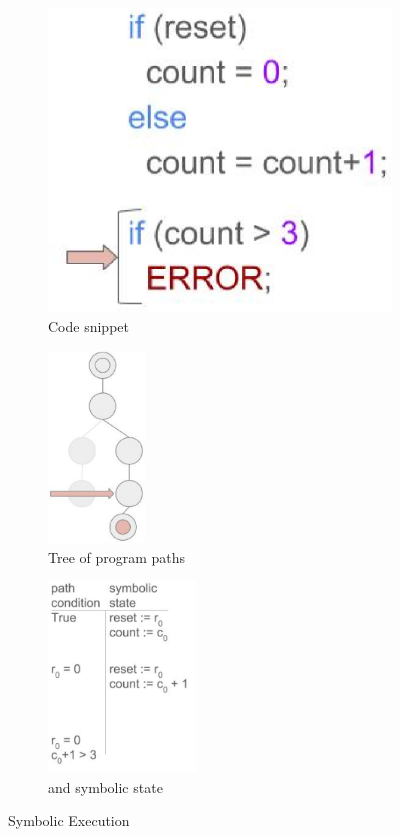 \begin{figure}
  \centering
  \begin{subfigure}[b]{0.3\textwidth}
    \includegraphics[trim=0 -1cm 0 0,width=\textwidth]{secode}
    \caption{Code snippet}
    \label{fig:secode}
    \end{subfigure}
  \quad
  \begin{subfigure}[b]{0.3\textwidth}
    \includegraphics[trim=-2cm -.5cm 0 0,height=2in]{setree}
    \caption{Tree of program paths}
    \label{fig:setree}
    \end{subfigure}
  \quad
  \begin{subfigure}[b]{0.3\textwidth}
    \includegraphics[height=2in]{setable}
    \caption{\pathcondition{} and symbolic state}
    \label{fig:setable}
    \end{subfigure}
  \caption{Symbolic Execution}
  \label{fig:se}
  \end{figure}
  
